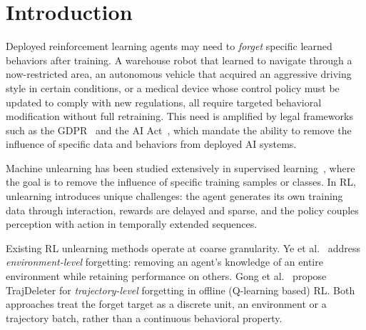 \documentclass[sigconf]{acmart}
\begin{document}


\maketitle

\section{Introduction}

Deployed reinforcement learning agents may need to \emph{forget} specific learned behaviors after training. A warehouse robot that learned to navigate through a now-restricted area, an autonomous vehicle that acquired an aggressive driving style in certain conditions, or a medical device whose control policy must be updated to comply with new regulations, all require targeted behavioral modification without full retraining. This need is amplified by legal frameworks such as the GDPR~\cite{gdpr2016} and the AI Act~\cite{ai_act2024}, which mandate the ability to remove the influence of specific data and behaviors from deployed AI systems.

Machine unlearning has been studied extensively in supervised learning~\cite{shaik2024exploringlandscapemachineunlearning, Chundawat_2023, ginart2019makingaiforgetyou}, where the goal is to remove the influence of specific training samples or classes. In RL, unlearning introduces unique challenges: the agent generates its own training data through interaction, rewards are delayed and sparse, and the policy couples perception with action in temporally extended sequences.

Existing RL unlearning methods operate at coarse granularity. Ye et al.~\cite{ye2024reinforcementunlearning} address \emph{environment-level} forgetting: removing an agent's knowledge of an entire environment while retaining performance on others. Gong et al.~\cite{gong2024trajdeleterenablingtrajectoryforgetting} propose TrajDeleter for \emph{trajectory-level} forgetting in offline (Q-learning based) RL. Both approaches treat the forget target as a discrete unit, an environment or a trajectory batch, rather than a continuous behavioral property.
\end{document}
